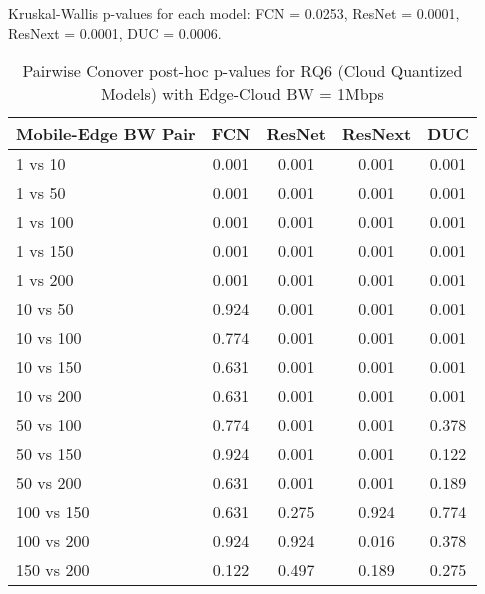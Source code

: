 \begin{table}[h]
\centering
\caption{Pairwise Conover post-hoc p-values for RQ6 (Cloud Quantized Models) with Edge-Cloud BW = 1Mbps}
\label{tab:conover_cloud_quantized_ec1}
\smallskip
Kruskal-Wallis p-values for each model: FCN = 0.0253, ResNet = 0.0001, ResNext = 0.0001, DUC = 0.0006.

\begin{tabular}{lcccc}
\toprule
Mobile-Edge BW Pair & FCN & ResNet & ResNext & DUC \\
\midrule
1 vs 10 & 0.001 & 0.001 & 0.001 & 0.001 \\
1 vs 50 & 0.001 & 0.001 & 0.001 & 0.001 \\
1 vs 100 & 0.001 & 0.001 & 0.001 & 0.001 \\
1 vs 150 & 0.001 & 0.001 & 0.001 & 0.001 \\
1 vs 200 & 0.001 & 0.001 & 0.001 & 0.001 \\
10 vs 50 & 0.924 & 0.001 & 0.001 & 0.001 \\
10 vs 100 & 0.774 & 0.001 & 0.001 & 0.001 \\
10 vs 150 & 0.631 & 0.001 & 0.001 & 0.001 \\
10 vs 200 & 0.631 & 0.001 & 0.001 & 0.001 \\
50 vs 100 & 0.774 & 0.001 & 0.001 & 0.378 \\
50 vs 150 & 0.924 & 0.001 & 0.001 & 0.122 \\
50 vs 200 & 0.631 & 0.001 & 0.001 & 0.189 \\
100 vs 150 & 0.631 & 0.275 & 0.924 & 0.774 \\
100 vs 200 & 0.924 & 0.924 & 0.016 & 0.378 \\
150 vs 200 & 0.122 & 0.497 & 0.189 & 0.275 \\
\bottomrule
\end{tabular}
\end{table}

